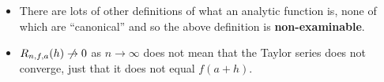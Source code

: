 \documentclass[../main.tex]{subfiles}
\begin{document}
\begin{remark}[Remarks]
  \begin{itemize}
    \item There are lots of other definitions of what an analytic function is, none of which are ``canonical'' and so the above definition is \textbf{non-examinable}.
    \item $R_{n, f, a}(h) \centernot\to 0$ as $n \to \infty$ does not mean that the Taylor series does not converge, just that it does not equal $f(a + h)$.
  \end{itemize}
\end{remark}
\end{document}
